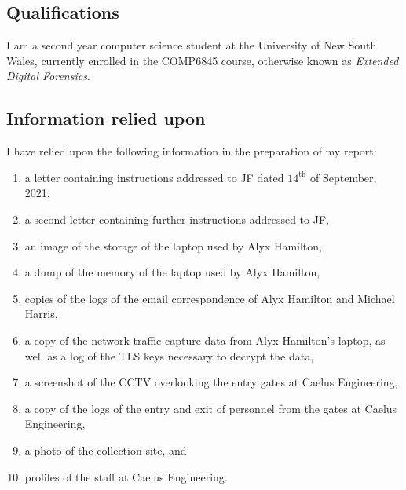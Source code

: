 
\subsection{Qualifications} %
\begin{myenum}
     \item I am a second year computer science student at the University of New South Wales, currently enrolled in the COMP6845 course, otherwise known as \emph{Extended Digital Forensics}.
\end{myenum}
\label{sub:qualifications}


\subsection{Information relied upon} %
\label{sub:information_relied_upon}

\begin{myenum}
     \item I have relied upon the following information in the preparation of my report:
         \begin{enumerate}
            \item a letter containing instructions addressed to JF dated $14^\text{th}$ of September, 2021,
            \item a second letter containing further instructions addressed to JF,
            \item an image of the storage of the laptop used by Alyx Hamilton,
            \item a dump of the memory of the laptop used by Alyx Hamilton,
            \item copies of the logs of the email correspondence of Alyx Hamilton and Michael Harris,
            \item a copy of the network traffic capture data from Alyx Hamilton's laptop, as well as a log of the TLS keys necessary to decrypt the data,
            \item a screenshot of the CCTV overlooking the entry gates at Caelus Engineering,
            \item a copy of the logs of the entry and exit of personnel from the gates at Caelus Engineering,
            \item a photo of the collection site, and 
            \item profiles of the staff at Caelus Engineering.
         \end{enumerate}
\end{myenum}

